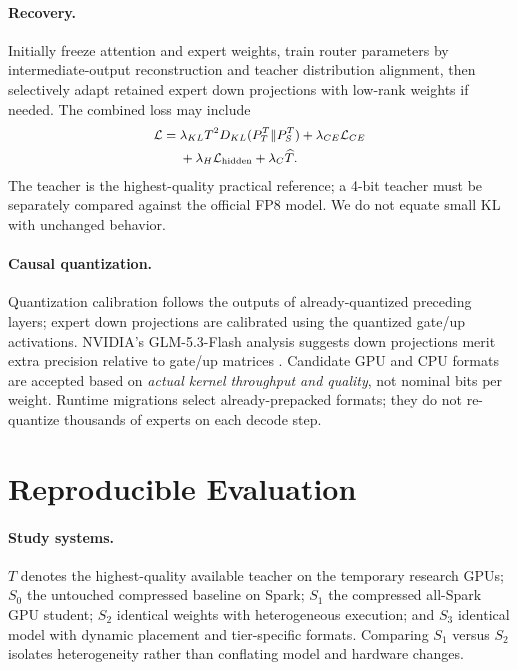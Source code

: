 \documentclass[10pt,twocolumn]{article}
\begin{document}
\paragraph{Recovery.} Initially freeze attention and expert weights, train router parameters by intermediate-output reconstruction and teacher distribution alignment, then selectively adapt retained expert down projections with low-rank weights if needed. The combined loss may include
\begin{equation}
\small
\begin{split}
\mathcal L=\;&\lambda_{KL}T^2D_{KL}(P_T^T\Vert P_S^T) + \lambda_{CE}\mathcal L_{CE}\\
&+\lambda_H\mathcal L_{\mathrm{hidden}}+\lambda_C\widehat T.
\end{split}
\end{equation}
The teacher is the highest-quality practical reference; a 4-bit teacher must be separately compared against the official FP8 model. We do not equate small KL with unchanged behavior.

\paragraph{Causal quantization.} Quantization calibration follows the outputs of already-quantized preceding layers; expert down projections are calibrated using the quantized gate/up activations. NVIDIA's GLM-5.3-Flash analysis suggests down projections merit extra precision relative to gate/up matrices \cite{nvidia-quant}. Candidate GPU and CPU formats are accepted based on \emph{actual kernel throughput and quality}, not nominal bits per weight. Runtime migrations select already-prepacked formats; they do not re-quantize thousands of experts on each decode step.

\section{Reproducible Evaluation}
\paragraph{Study systems.} $T$ denotes the highest-quality available teacher on the temporary research GPUs; $S_0$ the untouched compressed baseline on Spark; $S_1$ the compressed all-Spark GPU student; $S_2$ identical weights with heterogeneous execution; and $S_3$ identical model with dynamic placement and tier-specific formats. Comparing $S_1$ versus $S_2$ isolates heterogeneity rather than conflating model and hardware changes.
\end{document}
